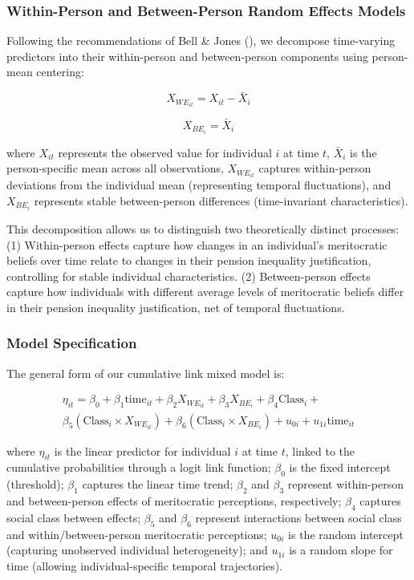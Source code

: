\documentclass[
  12pt,
]{article}
\begin{document}
\subsubsection{Within-Person and Between-Person Random Effects
Models}\label{within-person-and-between-person-random-effects-models}

Following the recommendations of Bell \& Jones
(), we decompose time-varying
predictors into their within-person and between-person components using
person-mean centering:

\[
X_{WE_{it}} = X_{it} - \bar{X}_i
\]

\[
X_{BE_i} = \bar{X}_i
\]

where \(X_{it}\) represents the observed value for individual \(i\) at
time \(t\), \(\bar{X}_i\) is the person-specific mean across all
observations, \(X_{WE_{it}}\) captures within-person deviations from the
individual mean (representing temporal fluctuations), and \(X_{BE_i}\)
represents stable between-person differences (time-invariant
characteristics).

This decomposition allows us to distinguish two theoretically distinct
processes: (1) Within-person effects capture how changes in an
individual's meritocratic beliefs over time relate to changes in their
pension inequality justification, controlling for stable individual
characteristics. (2) Between-person effects capture how individuals with
different average levels of meritocratic beliefs differ in their pension
inequality justification, net of temporal fluctuations.

\subsubsection{Model Specification}\label{model-specification}

The general form of our cumulative link mixed model is:

\[
\begin{split}
\eta_{it} = \beta_0 + \beta_1 \text{time}_{it} + \beta_2 X_{WE_{it}} + \beta_3 X_{BE_i} + \beta_4 \text{Class}_i + \\
\beta_5 (\text{Class}_i \times X_{WE_{it}}) + \beta_6 (\text{Class}_i \times X_{BE_i}) + u_{0i} + u_{1i} \text{time}_{it}
\end{split}
\]

where \(\eta_{it}\) is the linear predictor for individual \(i\) at time
\(t\), linked to the cumulative probabilities through a logit link
function; \(\beta_0\) is the fixed intercept (threshold); \(\beta_1\)
captures the linear time trend; \(\beta_2\) and \(\beta_3\) represent
within-person and between-person effects of meritocratic perceptions,
respectively; \(\beta_4\) captures social class between effects;
\(\beta_5\) and \(\beta_6\) represent interactions between social class
and within/between-person meritocratic perceptions; \(u_{0i}\) is the
random intercept (capturing unobserved individual heterogeneity); and
\(u_{1i}\) is a random slope for time (allowing individual-specific
temporal trajectories).
\end{document}
